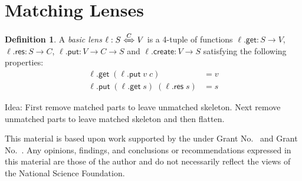 \documentclass[acmsmall,review,anonymous]{acmart}\settopmatter{printfolios=true,printccs=false,printacmref=false}
\theoremstyle{definition}
\newtheorem{definition}{Definition}
\newcommand{\kw}[1]{\ensuremath{\mathsf{#1}}\xspace}
\newcommand{\get}{\ensuremath{\kw{get}}\xspace}
\newcommand{\pput}{\ensuremath{\kw{put}}\xspace}
\newcommand{\create}{\ensuremath{\kw{create}}\xspace}
\newcommand{\res}{\ensuremath{\kw{res}}\xspace}
\begin{document}
\section{Matching Lenses}
\begin{definition}
A {\em basic lens} $\ell : S \xLeftrightarrow{C} V$ is a 4-tuple of functions
$\ell.\get : S \longrightarrow V$, $\ell.\res : S \longrightarrow C$,
$\ell.\pput : V \longrightarrow C \longrightarrow S$ and $\ell.\create : V
\longrightarrow S$ satisfying the following properties:
\begin{align*}
\ell.\get \; (\ell.\pput \; v \; c) &= v \tag{PUTGET}\\
\ell.\pput \; (\ell.\get \; s) \; (\ell.\res \; s) &= s \tag{GETPUT}
\end{align*}
\end{definition}
Idea: First remove matched parts to leave unmatched skeleton. Next remove
unmatched parts to leave matched skeleton and then flatten.
\begin{acks}                            %
This material is based upon work supported by the
 under Grant
No.~ and Grant
No.~.  Any opinions, findings, and
conclusions or recommendations expressed in this material are those
of the author and do not necessarily reflect the views of the
National Science Foundation.
\end{acks}
\fi


\end{document}
